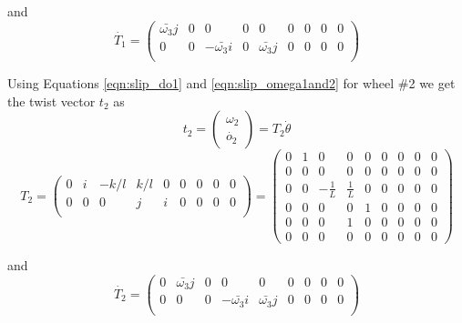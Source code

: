 {and 
\begin{equation}
\label{eqn:slip_dT1}
\dot{T_1}=\begin{pmatrix}
\bar{\omega_3}j & 0& 0& 0 & 0 &0 & 0 &0 &0\\
0 & 0& -\bar{\omega_3}i& 0 & \bar{\omega_3}j &0 & 0 &0 &0\\ 
\end{pmatrix}
\end{equation}

Using Equations \ref{eqn:slip_do1} and \ref{eqn:slip_omega1and2} for wheel \#2 we get the twist vector $t_2$  as 
\begin{equation}
\label{eqn:slip_t2}
t_2=
\begin{pmatrix}
\omega_2\\
\dot{o_2}
\end{pmatrix}=T_2 \dot{\theta}
\end{equation} 
\begin{equation}
\label{eqn:slip_T2}
T_2=
\begin{pmatrix}
0 & i& -k/l & k/l & 0 &0 & 0 &0 &0\\
0 & 0& 0& j &i &0 & 0 &0 &0\\ 
\end{pmatrix}=
\left(
\begin{array}{ccccccccc}
0 & 1 & 0 & 0 & 0 & 0 & 0 & 0 & 0 \\
0 & 0 & 0 & 0 & 0 & 0 & 0 & 0 & 0 \\
0 & 0 & -\frac{1}{L} & \frac{1}{L} & 0 & 0 & 0 & 0 & 0 \\
0 & 0 & 0 & 0 & 1 & 0 & 0 & 0 & 0 \\
0 & 0 & 0 & 1 & 0 & 0 & 0 & 0 & 0 \\
0 & 0 & 0 & 0 & 0 & 0 & 0 & 0 & 0
\end{array}
\right)
\end{equation}

and 
\begin{equation}
\label{eqn:slip_dT2}
\dot{T_2}=\begin{pmatrix}
0 & \bar{\omega_3}j & 0& 0 & 0 &0 & 0 &0 &0\\
0 & 0& 0& -\bar{\omega_3}i & \bar{\omega_3}j &0 & 0 &0 &0\\ 
\end{pmatrix}
\end{equation}


}
